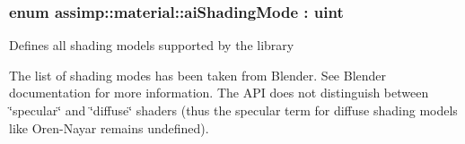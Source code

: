 \hypertarget{namespaceassimp_1_1material_ad8134a703f92e7023813f2b34a0753c0}{
\subsubsection[{ai\+Shading\+Mode}]{\setlength{\rightskip}{0pt plus 5cm}enum {\bf assimp\+::material\+::ai\+Shading\+Mode} \+: uint}}\label{namespaceassimp_1_1material_ad8134a703f92e7023813f2b34a0753c0}
Defines all shading models supported by the library

The list of shading modes has been taken from Blender. See Blender documentation for more information. The A\+P\+I does not distinguish between \char`\"{}specular\char`\"{} and \char`\"{}diffuse\char`\"{} shaders (thus the specular term for diffuse shading models like Oren-\/\+Nayar remains undefined).

